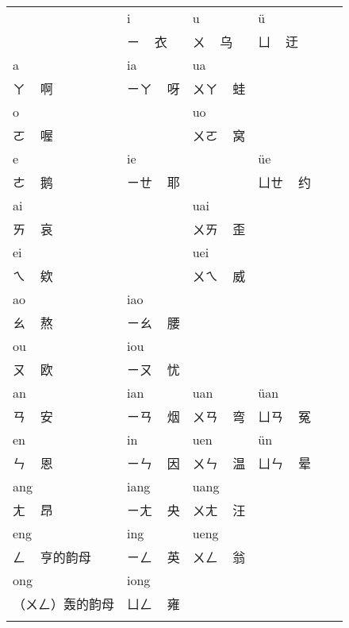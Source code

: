 \documentclass[zihao=-4,fontset=none]{ctexart}
\begin{document}
\begin{center}
  \begin{tabular}{Vp{4cm}|p{2.5cm}|p{2.5cm}|p{2.5cm}V}
        & i    & u    & ü   \\                  & ㄧ   ~ 衣 & ㄨ   ~ 乌 & ㄩ   ~ 迂 \\ \hline
    a   & ia   & ua   &     \\ ㄚ ~ 啊          & ㄧㄚ ~ 呀 & ㄨㄚ ~ 蛙 &           \\ \hline
    o   &      & uo   &     \\ ㄛ ~ 喔          &           & ㄨㄛ ~ 窝 &           \\ \hline
    e   & ie   &      & üe  \\ ㄜ ~ 鹅          & ㄧㄝ ~ 耶 &           & ㄩㄝ ~ 约 \\ \hline
    ai  &      & uai  &     \\ ㄞ ~ 哀          &           & ㄨㄞ ~ 歪 &           \\ \hline
    ei  &      & uei  &     \\ ㄟ ~ 欸          &           & ㄨㄟ ~ 威 &           \\ \hline
    ao  & iao  &      &     \\ ㄠ ~ 熬          & ㄧㄠ ~ 腰 &           &           \\ \hline
    ou  & iou  &      &     \\ ㄡ ~ 欧          & ㄧㄡ ~ 忧 &           &           \\ \hline
    an  & ian  & uan  & üan \\ ㄢ ~ 安          & ㄧㄢ ~ 烟 & ㄨㄢ ~ 弯 & ㄩㄢ ~ 冤 \\ \hline
    en  & in   & uen  & ün  \\ ㄣ ~ 恩          & ㄧㄣ ~ 因 & ㄨㄣ ~ 温 & ㄩㄣ ~ 晕 \\ \hline
    ang & iang & uang &     \\ ㄤ ~ 昂          & ㄧㄤ ~ 央 & ㄨㄤ ~ 汪 &           \\ \hline
    eng & ing  & ueng &     \\ ㄥ ~ 亨的韵母    & ㄧㄥ ~ 英 & ㄨㄥ ~ 翁 &           \\ \hline
    ong & iong &      &     \\ （ㄨㄥ）轰的韵母 & ㄩㄥ ~ 雍 &           &           \\
  \end{tabular}
\end{center}
\end{document}
